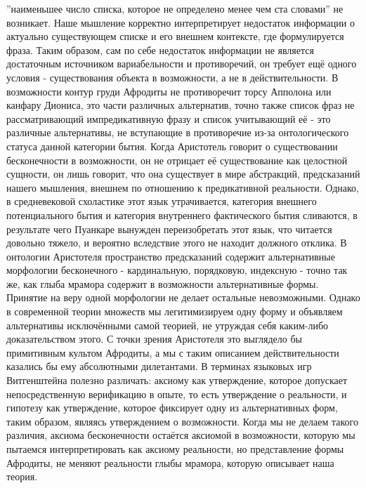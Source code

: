 \documentclass[12pt]{article}
\begin{document}
''наименьшее число списка, которое не определено менее чем ста словами'' не возникает. Наше мышление корректно интерпретирует недостаток информации о актуально существующем списке и его внешнем контексте, где формулируется фраза. Таким образом, сам по себе недостаток информации не является достаточным источником вариабельности и противоречий, он требует ещё одного условия - существования объекта в возможности, а не в действительности. В возможности контур груди Афродиты не противоречит торсу Апполона или канфару Диониса, это части различных альтернатив, точно также список фраз не рассматривающий импредикативную фразу и список учитывающий её - это различные альтернативы, не вступающие в противоречие из-за онтологического статуса данной категории бытия. Когда Аристотель говорит о существовании бесконечности в возможности, он не отрицает её существование как целостной сущности, он лишь говорит, что она существует в мире абстракций, предсказаний нашего мышления, внешнем по отношению к предикативной реальности. Однако, в средневековой схоластике этот язык утрачивается, категория внешнего потенциального бытия и категория внутреннего фактического бытия сливаются, в результате чего Пуанкаре вынужден переизобретать этот язык, что читается довольно тяжело, и вероятно вследствие этого не находит должного отклика. В онтологии Аристотеля пространство предсказаний содержит альтернативные морфологии бесконечного - кардинальную, порядковую, индексную - точно так же, как глыба мрамора содержит в возможности альтернативные формы. Принятие на веру одной морфологии не делает остальные невозможными. Однако в современной теории множеств мы легитимизируем одну форму и объявляем альтернативы исключёнными самой теорией, не утруждая себя каким-либо доказательством этого. С точки зрения Аристотеля это выглядело бы примитивным культом Афродиты, а мы с таким описанием действительности казались бы ему абсолютными дилетантами. В терминах языковых игр Витгенштейна полезно различать: аксиому как утверждение, которое допускает непосредственную верификацию в опыте, то есть утверждение о реальности, и гипотезу как утверждение, которое фиксирует одну из альтернативных форм, таким образом, являясь утверждением о возможности. Когда мы не делаем такого различия, аксиома бесконечности остаётся аксиомой в возможности, которую мы пытаемся интерпретировать как аксиому реальности, но представление формы Афродиты, не меняют реальности глыбы мрамора, которую описывает наша теория.
\end{document}
